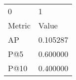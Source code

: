 \begin{tabular}{ll}
0 & 1 \\
Metric & Value \\
AP & 0.105287 \\
P@5 & 0.600000 \\
P@10 & 0.400000 \\
\end{tabular}
